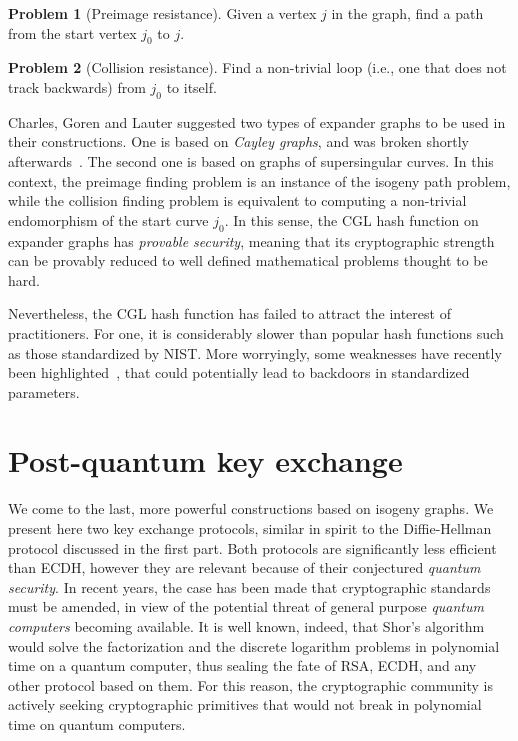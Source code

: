 \documentclass[10pt]{article}
\theoremstyle{plain}
\theoremstyle{definition}
\newtheorem{problem}{Problem}
\begin{document}
\begin{problem}[Preimage resistance]
  Given a vertex $j$ in the graph, find a path from the start vertex
  $j_0$ to $j$.
\end{problem}

\begin{problem}[Collision resistance]
  Find a non-trivial loop (i.e., one that does not track backwards)
  from $j_0$ to itself.
\end{problem}

Charles, Goren and Lauter suggested two types of expander graphs to be
used in their constructions. %
One is based on \emph{Cayley graphs}, and was broken shortly
afterwards~\cite{tillich2008collisions,quis}. %
The second one is based on graphs of supersingular curves. %
In this context, the preimage finding problem is an instance of the
isogeny path problem, while the collision finding problem is
equivalent to computing a non-trivial endomorphism of the start curve
$j_0$. %
In this sense, the CGL hash function on expander graphs has
\emph{provable security}, meaning that its cryptographic strength can
be provably reduced to well defined mathematical problems thought to
be hard.

Nevertheless, the CGL hash function has failed to attract the interest
of practitioners. %
For one, it is considerably slower than popular hash functions such as
those standardized by NIST. %
More worryingly, some weaknesses have recently been
highlighted~\cite{kohel2014quaternion}, that could potentially lead to
backdoors in standardized parameters.


\section{Post-quantum key exchange}
\label{sec:post-quantum-key}

We come to the last, more powerful constructions based on isogeny
graphs. %
We present here two key exchange protocols, similar in spirit to the
Diffie-Hellman protocol discussed in the first part. %
Both protocols are significantly less efficient than ECDH, however
they are relevant because of their conjectured \emph{quantum
  security}. %
In recent years, the case has been made that cryptographic standards
must be amended, in view of the potential threat of general purpose
\emph{quantum computers} becoming available. %
It is well known, indeed, that Shor's
algorithm~\cite{shor1994algorithms} would solve the factorization and
the discrete logarithm problems in polynomial time on a quantum
computer, thus sealing the fate of RSA, ECDH, and any other protocol
based on them. %
For this reason, the cryptographic community is actively seeking
cryptographic primitives that would not break in polynomial time on
quantum computers.
\end{document}

